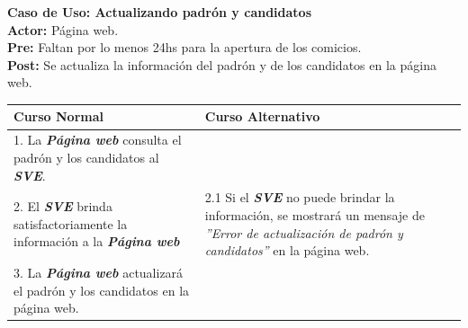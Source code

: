 \documentclass[spanish, 10pt,a4paper]{article}
\numberwithin{equation}{section} %
\begin{document}
\noindent\textbf{Caso de Uso: Actualizando padrón y candidatos}\\
\textbf{Actor: } Página web.\\
\textbf{Pre: } Faltan por lo menos 24hs para la apertura de los comicios.\\
\textbf{Post: } Se actualiza la información del padrón y de los candidatos en la página web.\\
\begin{table}[H]
  \centering
  \begin{tabular}{p{9cm} | p{7cm}}
    \hline
    Curso Normal & Curso Alternativo \\
    \hline
    \hline    
    1. La \textbf{\textit{Página web}} consulta el padrón y los candidatos al \textbf{\textit{SVE}}. 
    & \\
    
    \hline
    2. El \textbf{\textit{SVE}} brinda satisfactoriamente la información a la \textbf{\textit{Página web}}
    & 
    2.1 Si el \textbf{\textit{SVE}} no puede brindar la información, se mostrará un mensaje de \textit{''Error de actualización de padrón y candidatos''} en la página web.
    \\
    
    \hline
    3. La \textbf{\textit{Página web}} actualizará el padrón y los candidatos en la página web.
    & \\
    \hline
  \end{tabular}
\end{table}
\end{document}

